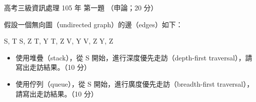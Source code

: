 \begin{pastexam}[label={px:gk3-105-ds-01}]{高考三級資訊處理 105 年 第一題}
（申論；20 分）

假設一個無向圖（undirected graph）的邊（edges）如下：
\begin{center}
S, T \quad S, Z \quad T, Y \quad T, Z \quad V, Y \quad V, Z \quad Y, Z
\end{center}
\begin{itemize}[leftmargin=2.2em]
\item[㈠] 使用堆疊（stack），從 S 開始，進行深度優先走訪（depth-first traversal），請寫出走訪結果。（10 分）
\item[㈡] 使用佇列（queue），從 S 開始，進行廣度優先走訪（breadth-first traversal），請寫出走訪結果。（10 分）
\end{itemize}
\end{pastexam}

